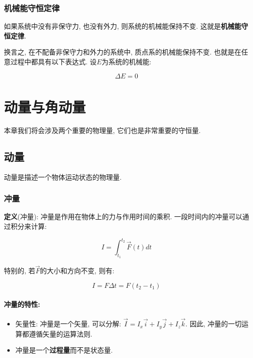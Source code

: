 \documentclass[
  a4paper,
]{ctexrep}
\providecommand{\tightlist}{%
  \setlength{\itemsep}{0pt}\setlength{\parskip}{0pt}}
\begin{document}
\subsection{机械能守恒定律}\label{ux673aux68b0ux80fdux5b88ux6052ux5b9aux5f8b}

如果系统中没有非保守力, 也没有外力, 则系统的机械能保持不变.
这就是\textbf{机械能守恒定律}.

换言之, 在不配备非保守力和外力的系统中, 质点系的机械能保持不变.
也就是在任意过程中都具有以下表达式. 设\(E\)为系统的机械能:

\[
\Delta E = 0
\]

\chapter{动量与角动量}\label{ux52a8ux91cfux4e0eux89d2ux52a8ux91cf}

本章我们将会涉及两个重要的物理量, 它们也是非常重要的守恒量.

\section{动量}\label{ux52a8ux91cf}

动量是描述一个物体运动状态的物理量.

\subsection{冲量}\label{ux51b2ux91cf}

\textbf{定义}(冲量): 冲量是作用在物体上的力与作用时间的乘积.
一段时间内的冲量可以通过积分来计算:

\[
I = \int_{t_1}^{t_2} \vec{F}(t) dt
\]

特别的, 若\(\vec{F}\)的大小和方向不变, 则有:

\[
I = F \Delta t = F (t_2 - t_1)
\]

\subsubsection{冲量的特性:}\label{ux51b2ux91cfux7684ux7279ux6027}

\begin{itemize}
\tightlist
\item
  矢量性: 冲量是一个矢量, 可以分解:
  \(\vec{I} = I_x \vec{i} + I_y \vec{j} + I_z \vec{k}\). 因此,
  冲量的一切运算都遵循矢量的运算法则.
\item
  冲量是一个\textbf{过程量}而不是状态量.
\end{itemize}
\end{document}
